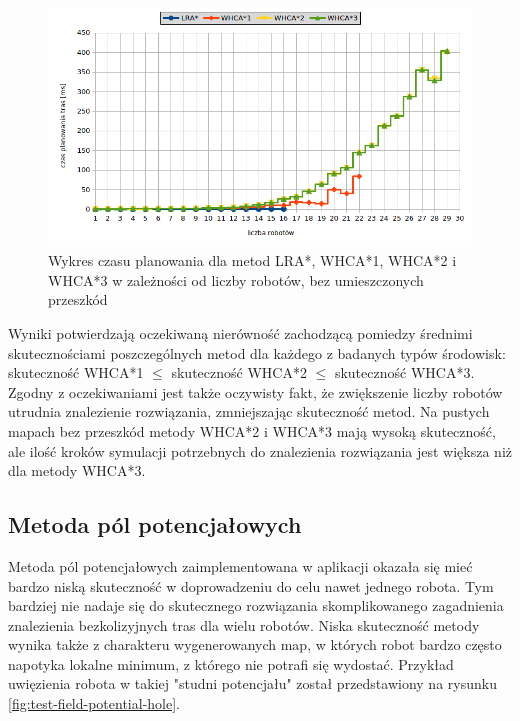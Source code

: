 \begin{figure}
	\centering
	\includegraphics[width=0.8\columnwidth]{img/plots/test-steps-empty-robots-calctime}
	\caption{Wykres czasu planowania dla metod LRA*, WHCA*1, WHCA*2 i WHCA*3 w zależności od liczby robotów, bez umieszczonych przeszkód}
	\label{fig:test-steps-empty-robots-calctime}
\end{figure}

Wyniki potwierdzają oczekiwaną nierówność zachodzącą pomiedzy średnimi skutecznościami poszczególnych metod dla każdego z badanych typów środowisk:
skuteczność WHCA*1 $\le$ skuteczność WHCA*2 $\le$ skuteczność WHCA*3.
Zgodny z oczekiwaniami jest także oczywisty fakt, że zwiększenie liczby robotów utrudnia znalezienie rozwiązania, zmniejszając skuteczność metod.
Na pustych mapach bez przeszkód metody WHCA*2 i WHCA*3 mają wysoką skuteczność, ale ilość kroków symulacji potrzebnych do znalezienia rozwiązania jest większa niż dla metody WHCA*3.

\subsection{Metoda pól potencjałowych}
Metoda pól potencjałowych zaimplementowana w aplikacji okazała się mieć bardzo niską skuteczność w doprowadzeniu do celu nawet jednego robota.
Tym bardziej nie nadaje się do skutecznego rozwiązania skomplikowanego zagadnienia znalezienia bezkolizyjnych tras dla wielu robotów.
Niska skuteczność metody wynika także z charakteru wygenerowanych map, w których robot bardzo często napotyka lokalne minimum, z którego nie potrafi się wydostać.
Przykład uwięzienia robota w takiej "studni potencjału" został przedstawiony na rysunku \ref{fig:test-field-potential-hole}.

